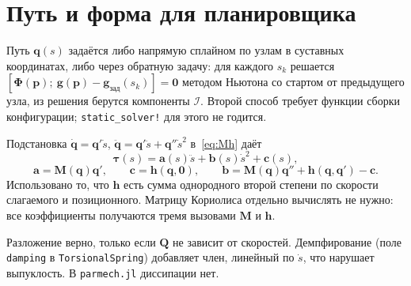 \documentclass[11pt,a4paper]{article}
\newcommand{\bp}{\mathbf{p}}
\newcommand{\bq}{\mathbf{q}}
\newcommand{\bM}{\mathbf{M}}
\newcommand{\bQ}{\mathbf{Q}}
\newcommand{\bh}{\mathbf{h}}
\newcommand{\ba}{\mathbf{a}}
\newcommand{\bb}{\mathbf{b}}
\newcommand{\bc}{\mathbf{c}}
\newcommand{\bg}{\mathbf{g}}
\newcommand{\bzero}{\mathbf{0}}
\newcommand{\bPhi}{\boldsymbol{\Phi}}
\newcommand{\btau}{\boldsymbol{\tau}}
\newcommand{\code}[1]{\texttt{#1}}
\begin{document}
\section{Путь и форма для планировщика}

Путь $\bq(s)$ задаётся либо напрямую сплайном по узлам в суставных
координатах, либо через обратную задачу: для каждого $s_k$ решается
$[\bPhi(\bp);\ \bg(\bp)-\bg_{\text{зад}}(s_k)]=\bzero$ методом Ньютона со
стартом от предыдущего узла, из решения берутся компоненты $\mathcal I$.
Второй способ требует функции сборки конфигурации; \code{static\_solver!}
для этого не годится.

Подстановка $\dot{\bq}=\bq'\dot s$, $\ddot{\bq}=\bq'\ddot s+\bq''\dot s^{2}$
в~\eqref{eq:Mh} даёт
\begin{equation}
\btau(s)=\ba(s)\ddot s+\bb(s)\dot s^{2}+\bc(s),
\end{equation}
\begin{equation}
\ba=\bM(\bq)\bq',
\qquad
\bc=\bh(\bq,\bzero),
\qquad
\bb=\bM(\bq)\bq''+\bh(\bq,\bq')-\bc .
\end{equation}
Использовано то, что $\bh$ есть сумма однородного второй степени по скорости
слагаемого и позиционного. Матрицу Кориолиса отдельно вычислять не нужно:
все коэффициенты получаются тремя вызовами $\bM$ и $\bh$.

Разложение верно, только если $\bQ$ не зависит от скоростей. Демпфирование
(поле \code{damping} в \code{TorsionalSpring}) добавляет член, линейный по
$\dot s$, что нарушает выпуклость. В \code{parmech.jl} диссипации нет.
\end{document}

